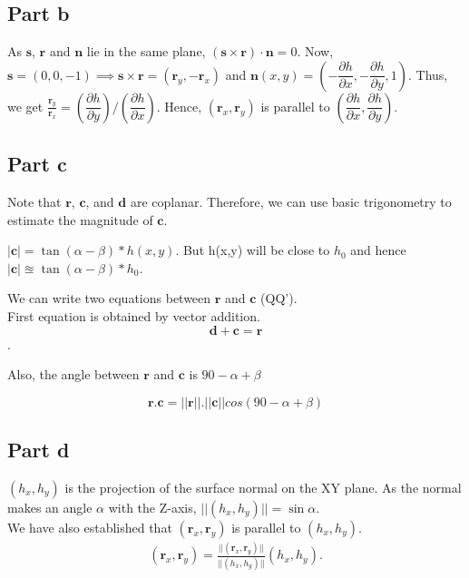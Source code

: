 \documentclass[11pt]{article}
\begin{document}
\subsection*{Part b}
As $\mathbf{s}$, $\mathbf{r}$ and $\mathbf{n}$ lie in the same plane, $(\mathbf{s}\times\mathbf{r})\cdot\mathbf{n}=0$. Now, $\mathbf{s} = (0,0,-1) \implies \mathbf{s}\times\mathbf{r} = (\mathbf{r}_y,-\mathbf{r}_x)$ and $\mathbf{n}(x,y) = \left( -\dfrac{\partial h}{\partial x},-\dfrac{\partial h}{\partial y},1 \right)$. Thus, we get $\frac{\mathbf{r}_y}{\mathbf{r}_x} = \left(\dfrac{\partial h}{\partial y}\right)/\left(\dfrac{\partial h}{\partial x}\right)$. Hence, $(\mathbf{r}_x,\mathbf{r}_y)$ is parallel to $(\dfrac{\partial h}{\partial x},\dfrac{\partial h}{\partial y})$.

\subsection*{Part c}
Note that $\mathbf{r}$, $\mathbf{c}$, and $\mathbf{d}$ are coplanar. Therefore, we can use basic trigonometry to estimate the magnitude of $\mathbf{c}$.

$|\mathbf{c}| = \tan(\alpha-\beta) * h(x,y)$. But h(x,y) will be close to $h_{0}$ and hence $|\mathbf{c}| \approxeq \tan(\alpha-\beta) * h_{0}$.

We can write two equations between $\mathbf{r}$ and $\mathbf{c}$ (QQ').\\
First equation is obtained by vector addition.
$$ \mathbf{d} + \mathbf{c} = \mathbf{r}$$.


Also, the angle between $\mathbf{r}$ and $\mathbf{c}$ is $90 - \alpha + \beta$

$$ \mathbf{r}.\mathbf{c} = ||\mathbf{r}||.||\mathbf{c}|| cos(90 - \alpha + \beta) $$

\subsection*{Part d}

$(h_{x},h_{y})$ is the projection of the surface normal on the XY plane. As the normal makes an angle $\alpha$ with the Z-axis, $||(h_{x},h_{y})|| = \sin\alpha$.\\

We have also established that $(\mathbf{r}_{x},\mathbf{r}_{y})$ is parallel to $(h_{x},h_{y})$.
\begin{gather*}
(\mathbf{r}_{x},\mathbf{r}_{y}) =  \frac{||(\mathbf{r}_{x},\mathbf{r}_{y})||}{||(h_{x},h_{y})||}(h_{x},h_{y}).
\end{gather*}
\end{document}
